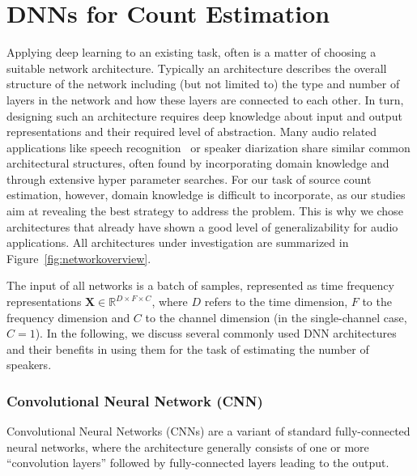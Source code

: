 \section{DNNs for Count Estimation}%
\label{sec:supervised_learning}
Applying deep learning to an existing task, often is a matter of choosing a suitable network architecture.
Typically an architecture describes the overall structure of the network including (but not limited to) the type and number of layers in the network and how these layers are connected to each other.
In turn, designing such an architecture requires deep knowledge about input and output representations and their required level of abstraction.
Many audio related applications like speech recognition~\cite{HintonSpeech} or speaker diarization share similar common architectural structures, often found by incorporating domain knowledge and through extensive hyper parameter searches.
For our task of source count estimation, however, domain knowledge is difficult to incorporate, as our studies aim at revealing the best strategy to address the problem.
This is why we chose architectures that already have shown a good level of generalizability for audio applications.
All architectures under investigation are summarized in Figure~\ref{fig:networkoverview}.
\par
The input of all networks is a batch of samples, represented as time frequency representations \(\mathbf{X} \in \mathbb{R}^{ D \times F \times C } \), where \(D\) refers to the time dimension, \(F\) to the frequency dimension and \(C\) to the channel dimension (in the single-channel case, \(C=1\)).
In the following, we discuss several commonly used DNN architectures and their benefits in using them for the task of estimating the number of speakers.


\subsubsection{Convolutional Neural Network (CNN)}%
Convolutional Neural Networks (CNNs) are a variant of standard fully-connected neural networks, where the architecture generally consists of one or more ``convolution layers'' followed by fully-connected layers leading to the output.

